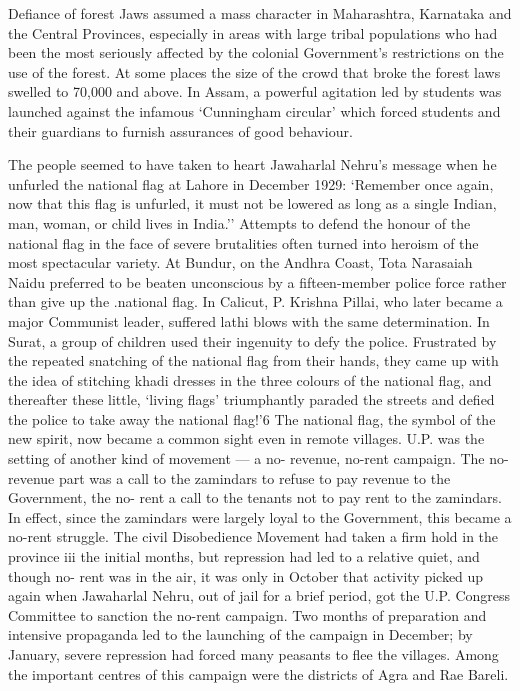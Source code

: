 Defiance of forest Jaws assumed a mass character in Maharashtra, Karnataka and the Central Provinces, especially in areas with large tribal populations who had been the most seriously affected by the colonial Government's restrictions on the use of the forest. At some places the size of the crowd that broke the forest laws swelled to 70,000 and above. In Assam, a powerful agitation led by students was launched against the infamous `Cunningham circular' which forced students and their guardians to furnish assurances of good behaviour.

The people seemed to have taken to heart Jawaharlal Nehru's message when he unfurled the national flag at Lahore in December 1929: `Remember once again, now that this flag is unfurled, it must not be lowered as long as a single Indian, man, woman, or child lives in India.'' Attempts to defend the honour of the national flag in the face of severe brutalities often turned into heroism of the most spectacular variety. At Bundur, on the Andhra Coast, Tota Narasaiah Naidu preferred to be beaten unconscious by a fifteen-member police force rather than give up the .national flag. In Calicut, P. Krishna Pillai, who later became a major Communist leader, suffered lathi blows with the same determination. In Surat, a group of children used their ingenuity to defy the police. Frustrated by the repeated snatching of the national flag from their hands, they came up with the idea of stitching khadi dresses in the three colours of the national flag, and thereafter these little, `living flags' triumphantly paraded the streets and defied the police to take away the national flag!'6 The national flag, the symbol of the new spirit, now became a common sight even in remote villages. U.P. was the setting of another kind of movement --- a no- revenue, no-rent campaign. The no-revenue part was a call to the zamindars to refuse to pay revenue to the Government, the no- rent a call to the tenants not to pay rent to the zamindars. In effect, since the zamindars were largely loyal to the Government, this became a no-rent struggle. The civil Disobedience Movement had taken a firm hold in the province iii the initial months, but repression had led to a relative quiet, and though no- rent was in the air, it was only in October that activity picked up again when Jawaharlal Nehru, out of jail for a brief period, got the U.P. Congress Committee to sanction the no-rent campaign. Two months of preparation and intensive propaganda led to the launching of the campaign in December; by January, severe repression had forced many peasants to flee the villages. Among the important centres of this campaign were the districts of Agra and Rae Bareli.


